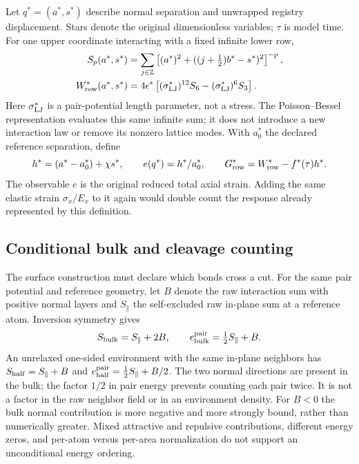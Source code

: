 \documentclass[11pt]{article}
\begin{document}
Let $q^*=(a^*,s^*)$ describe normal separation and unwrapped registry displacement.
Stars denote the original dimensionless variables; $\tau$ is model time.
For one upper coordinate interacting with a fixed infinite lower row,
\begin{align}
 S_p(a^*,s^*)&=\sum_{j\in\mathbb Z}
 \left[(a^*)^2+((j+\tfrac12)b^*-s^*)^2\right]^{-p},\\
 W_{\rm row}^*(a^*,s^*)&=4\epsilon^*
 \left[(\sigma_{\rm LJ}^*)^{12}S_6-(\sigma_{\rm LJ}^*)^6S_3\right].
\end{align}
Here $\sigma_{\rm LJ}^*$ is a pair-potential length parameter, not a stress.
The Poisson--Bessel representation evaluates this same infinite sum;
it does not introduce a new interaction law or remove its nonzero lattice modes.
With $a_0^*$ the declared reference separation, define
\begin{equation}
 h^*=(a^*-a_0^*)+\chi s^*,\qquad
 e(q^*)=h^*/a_0^*,\qquad G_{\rm row}^*=W_{\rm row}^*-f^*(\tau)h^*.
\end{equation}
The observable $e$ is the original reduced total axial strain.
Adding the same elastic strain $\sigma_x/E_x$ to it again would double count
the response already represented by this definition.

\subsection{Conditional bulk and cleavage counting}
\label{sec:surface-bulk-count}
The surface construction must declare which bonds cross a cut.  For the
same pair potential and reference geometry, let $B$ denote the raw
interaction sum with positive normal layers and $S_\parallel$ the
self-excluded raw in-plane sum at a reference atom.  Inversion symmetry gives
\begin{equation}
 S_{\rm bulk}=S_\parallel+2B,\qquad
 e_{\rm bulk}^{\rm pair}=\tfrac12S_\parallel+B .
 \label{eq:r10-bulk-count}
\end{equation}
An unrelaxed one-sided environment with the same in-plane neighbors has
$S_{\rm half}=S_\parallel+B$ and
$e_{\rm half}^{\rm pair}=\tfrac12S_\parallel+B/2$.
The two normal directions are present in the bulk; the factor $1/2$ in
pair energy prevents counting each pair twice.  It is not a factor in
the raw neighbor field or in an environment density.  For $B<0$ the bulk
normal contribution is more negative and more strongly bound, rather
than numerically greater.  Mixed attractive and repulsive contributions,
different energy zeros, and per-atom versus per-area normalization do
not support an unconditional energy ordering.
\end{document}
